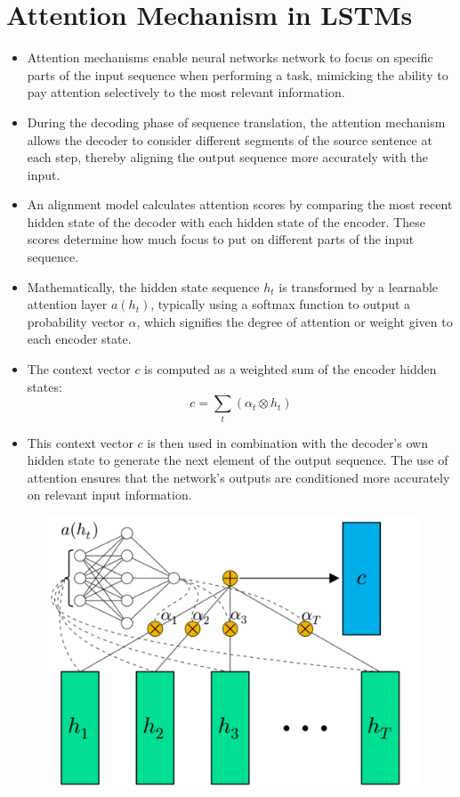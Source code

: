 \section{Attention Mechanism in LSTMs}
\begin{itemize}
    \item Attention mechanisms enable neural networks network to focus on specific parts of the input sequence when performing a task, mimicking the ability to pay attention selectively to the most relevant information.
    \item During the decoding phase of sequence translation, the attention mechanism allows the decoder to consider different segments of the source sentence at each step, thereby aligning the output sequence more accurately with the input.
    \item An alignment model calculates attention scores by comparing the most recent hidden state of the decoder with each hidden state of the encoder. These scores determine how much focus to put on different parts of the input sequence.
    \item Mathematically, the hidden state sequence \( h_t \) is transformed by a learnable attention layer \( a(h_t) \), typically using a softmax function to output a probability vector \( \alpha \), which signifies the degree of attention or weight given to each encoder state.
    \item The context vector \( c \) is computed as a weighted sum of the encoder hidden states:
    \begin{equation*}
        c = \sum_{t} (\alpha_t \otimes h_t)
    \end{equation*}
    \item This context vector \( c \) is then used in combination with the decoder's own hidden state to generate the next element of the output sequence. The use of attention ensures that the network's outputs are conditioned more accurately on relevant input information.
\end{itemize}

\begin{figure}[H]
    \centering
    \includegraphics[width=0.5\linewidth]{img/attention_mechanism.png}
    
    
\end{figure}

